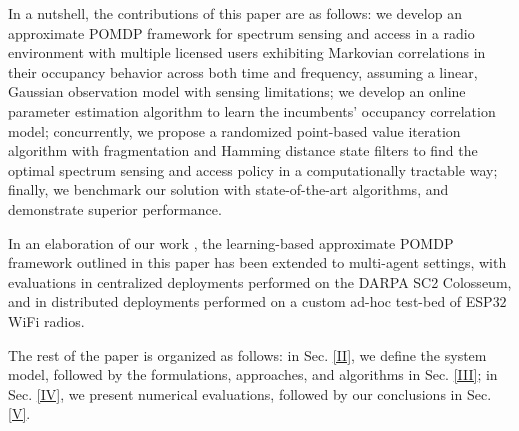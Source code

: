 \documentclass[10pt,twocolumn]{IEEEtran}
\begin{document}
 In a nutshell, the contributions of this paper are as follows:
we develop an approximate POMDP framework for spectrum sensing and access in a radio environment with multiple licensed users exhibiting Markovian correlations in their occupancy behavior across both time and frequency, assuming a linear, Gaussian observation model with sensing limitations; we develop an online parameter estimation algorithm to learn the incumbents' occupancy correlation model; concurrently, we propose a randomized point-based value iteration algorithm with fragmentation and Hamming distance state filters to find the optimal spectrum sensing and access policy in a computationally tractable way; finally, we benchmark our solution with state-of-the-art algorithms, and demonstrate superior performance. 

 In an elaboration of our work \cite{TCCN:paper}, the learning-based approximate POMDP framework outlined in this paper has been extended to multi-agent settings, with evaluations in centralized deployments performed on the DARPA SC2 Colosseum, and in distributed deployments performed on a custom ad-hoc test-bed of ESP$32$ WiFi radios.

The rest of the paper is organized as follows: in Sec. \ref{II}, we define the system model, followed by the formulations, approaches, and algorithms in Sec. \ref{III}; in Sec. \ref{IV}, we present numerical evaluations, followed by our conclusions in Sec. \ref{V}.
\vspace{-8mm}
\end{document}
